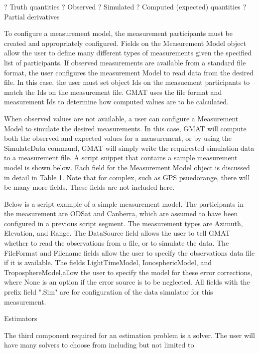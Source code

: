?   Truth quantities ?   Observed ?   Simulated ?   Computed
(expected) quantities ?   Partial derivatives

To configure a measurement model, the measurement participants must
be created and appropriately configured.   Fields on the Measurement
Model object allow the user to define many different types of
measurements given the specified list of participants.   If observed
measurements are available from a standard file format, the user
configures the measurement Model to read data from the desired file.
In this case, the user must set object Ids on the measuement
participants to match the Ids on the measurement file.  GMAT uses
the file format and measurement Ids to determine how computed values
are to be calculated.

When observed values are not available, a user can configure a
Measurement Model to simulate the desired measurements.  In this
case, GMAT will compute both the observed and expected values for a
measurement, or by using the SimulateData command, GMAT will simply
write the requirested simulation data to a measurement file.    A
script snippet that contains a sample measurement model is shown
below.  Each field for the Measurement Model object is discussed in
detail in Table 1.  Note that for complex, such as GPS psuedorange,
there will be many more fields.  These fields are not included here.

Below is a script example of a simple measurement model.  The
participants in the measurement are ODSat and Canberra, which are
assumed to have been configured in a previous script segment.   The
measurement types are Azimuth, Elevation, and Range.  The DataSource
field allows the user to tell GMAT whether to read the observations
from a file, or to simulate the data. The FileFormat and Filename
fields allow the user to specify the observations data file if it is
available.    The fields  LightTimeModel, IonosphericModel, and
TroposphereModel,allow the user to specify the model for these error
corrections, where None is an option if the error source is to be
neglected.   All fields with the prefix field ".Sim" are for
configuration of the data simulator for this measurement.





Estimators

The third component required for an estimation problem is a solver.
The user will have many solvers to choose from including but not
limited to

